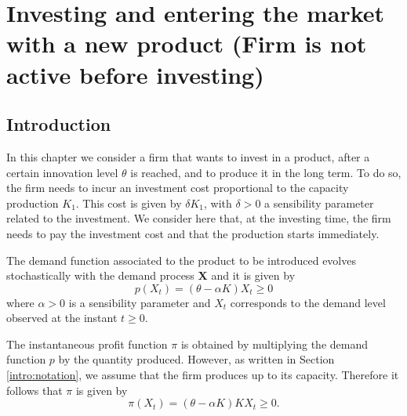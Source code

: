 


\chapter{Investing and entering the market with a new product (Firm is not active before investing)}
\label{chapter:1}



\section{Introduction}
\label{section:overview}

In this chapter we consider a firm that wants to invest in a product, after a certain innovation level $\theta$ is reached, and to produce it in the long term. To do so, the firm needs to incur an investment cost proportional to the capacity production $K_1$. This cost is given by $\delta K_1$, with $\delta>0$ a sensibility parameter related to the investment. We consider here that, at the investing time, the firm needs to pay the investment cost and that the production starts immediately.


The demand function associated to the product to be introduced evolves stochastically with the demand process \textbf{X} and it is given by
\begin{equation}
p(X_t)=(\theta-\alpha K) X_t \geq 0
\label{prob1:pi}
\end{equation}
where $\alpha>0$ is a sensibility parameter and $X_t$ corresponds to the demand level observed at the instant $t\geq0$.

The instantaneous profit function $\pi$ is obtained by multiplying the demand function $p$ by the quantity produced. However, as written in Section \ref{intro:notation}, we assume that the firm produces up to its capacity. Therefore it follows that $\pi$ is given by
\begin{equation}
\pi(X_t)=(\theta-\alpha K)K X_t \geq 0.
\label{prob1:pi}
\end{equation}



